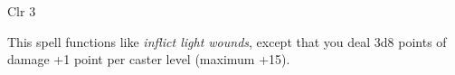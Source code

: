 
\begin{description*}
\item[Level:] Clr 3
\end{description*}

This spell functions like \textit{inflict light wounds}, except that you deal 3d8
points of damage +1 point per caster level (maximum +15).